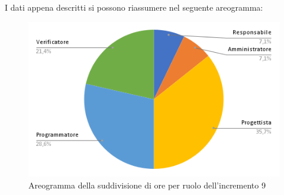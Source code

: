 \pagebreak
I dati appena descritti si possono riassumere nel seguente areogramma:
\begin{figure}[!h]
    \vspace{5px}
    \includegraphics[scale=0.5]{../../../Images/Diagrammi/Diagramma a torta/areogrammaIncremento9.png}
    \centering
    \caption{Areogramma della suddivisione di ore per ruolo dell'incremento 9}
\end{figure}


